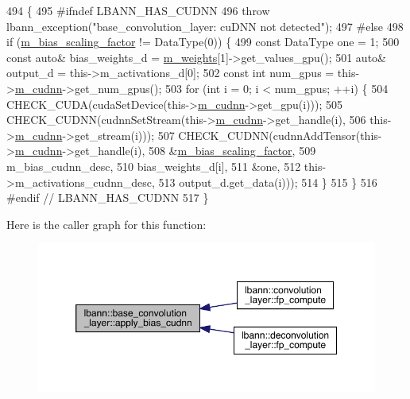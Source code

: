 \begin{DoxyCode}
494                           \{
495 \textcolor{preprocessor}{  #ifndef LBANN\_HAS\_CUDNN}
496     \textcolor{keywordflow}{throw} lbann\_exception(\textcolor{stringliteral}{"base\_convolution\_layer: cuDNN not detected"});
497 \textcolor{preprocessor}{  #else}
498     \textcolor{keywordflow}{if} (\hyperlink{classlbann_1_1base__convolution__layer_a5abe0bcd128b66a41fa481b28a9c2104}{m\_bias\_scaling\_factor} != DataType(0)) \{
499       \textcolor{keyword}{const} DataType one = 1;
500       \textcolor{keyword}{const} \textcolor{keyword}{auto}& bias\_weights\_d = \hyperlink{classlbann_1_1Layer_a7954e30fbf9100a6ba4b56d02767a469}{m\_weights}[1]->get\_values\_gpu();
501       \textcolor{keyword}{auto}& output\_d = this->m\_activations\_d[0];
502       \textcolor{keyword}{const} \textcolor{keywordtype}{int} num\_gpus = this->\hyperlink{classlbann_1_1Layer_a08dbb94239e3b8c96329786c57c72e21}{m\_cudnn}->get\_num\_gpus();
503       \textcolor{keywordflow}{for} (\textcolor{keywordtype}{int} i = 0; i < num\_gpus; ++i) \{
504         CHECK\_CUDA(cudaSetDevice(this->\hyperlink{classlbann_1_1Layer_a08dbb94239e3b8c96329786c57c72e21}{m\_cudnn}->get\_gpu(i)));
505         CHECK\_CUDNN(cudnnSetStream(this->\hyperlink{classlbann_1_1Layer_a08dbb94239e3b8c96329786c57c72e21}{m\_cudnn}->get\_handle(i),
506                                    this->\hyperlink{classlbann_1_1Layer_a08dbb94239e3b8c96329786c57c72e21}{m\_cudnn}->get\_stream(i)));
507         CHECK\_CUDNN(cudnnAddTensor(this->\hyperlink{classlbann_1_1Layer_a08dbb94239e3b8c96329786c57c72e21}{m\_cudnn}->get\_handle(i),
508                                    &\hyperlink{classlbann_1_1base__convolution__layer_a5abe0bcd128b66a41fa481b28a9c2104}{m\_bias\_scaling\_factor},
509                                    m\_bias\_cudnn\_desc,
510                                    bias\_weights\_d[i],
511                                    &one,
512                                    this->m\_activations\_cudnn\_desc,
513                                    output\_d.get\_data(i)));
514       \}
515     \}
516 \textcolor{preprocessor}{  #endif // LBANN\_HAS\_CUDNN}
517   \}
\end{DoxyCode}
Here is the caller graph for this function\+:\nopagebreak
\begin{figure}[H]
\begin{center}
\leavevmode
\includegraphics[width=350pt]{classlbann_1_1base__convolution__layer_aa33e490222597c4c5203d94061ae9d88_icgraph}
\end{center}
\end{figure}
